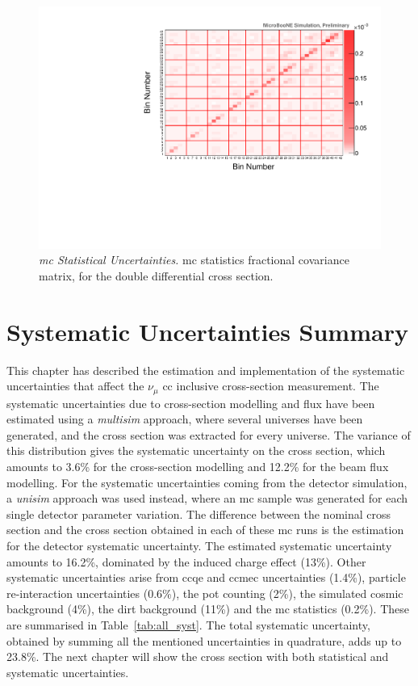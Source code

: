 \begin{figure}[]
\centering
\includegraphics[width=.80\textwidth]{images/mc_stat_covariance_plots/mc_stat_multisim_muangle_mumom_cov_matrix_2d}
\caption[\acrshort{mc} Statistical Systematic Uncertainties]{\emph{\acrshort{mc} Statistical Uncertainties.} \acrshort{mc} statistics fractional covariance matrix, for the double differential cross section.}
\label{fig:mc_stat_multisim_muangle_mumom_cov_matrix_2d}
\end{figure}


\clearpage
\section{Systematic Uncertainties Summary}
\label{sec:syst_unc_summary}

This chapter has described the estimation and implementation of the systematic uncertainties that affect the $\nu_\mu$ \acrshort{cc} inclusive cross-section measurement. The systematic uncertainties due to cross-section modelling and flux have been estimated using a \emph{multisim} approach, where several universes have been generated, and the cross section was extracted for every universe. The variance of this distribution gives the systematic uncertainty on the cross section, which amounts to 3.6\% for the cross-section modelling and 12.2\% for the beam flux modelling.
For the systematic uncertainties coming from the detector simulation, a \emph{unisim} approach was used instead, where an \acrshort{mc} sample was generated for each single detector parameter variation. The difference between the nominal cross section and the cross section obtained in each of these \acrshort{mc} runs is the estimation for the detector systematic uncertainty. The estimated systematic uncertainty amounts to 16.2\%, dominated by the induced charge effect (13\%).
Other systematic uncertainties arise from \acrshort{cc}\acrshort{qe} and \acrshort{cc}\acrshort{mec} uncertainties (1.4\%), particle re-interaction uncertainties (0.6\%), the \acrshort{pot} counting (2\%), the simulated cosmic background (4\%), the dirt background (11\%) and the \acrshort{mc} statistics (0.2\%). These are summarised in Table~\ref{tab:all_syst}. The total systematic uncertainty, obtained by summing all the mentioned uncertainties in quadrature, adds up to 23.8\%.
The next chapter will show the cross section with both statistical and systematic uncertainties.

